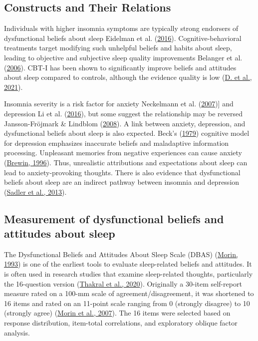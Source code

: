 \documentclass[
  ,doc,11pt, twoside,floatsintext]{apa6}
\begin{document}
\hypertarget{constructs-and-their-relations}{%
\subsection{Constructs and Their Relations}\label{constructs-and-their-relations}}

Individuals with higher insomnia symptoms are typically strong endorsers of dysfunctional beliefs about sleep Eidelman et al. (\protect\hyperlink{ref-eidelman2016}{2016}). Cognitive-behavioral treatments target modifying such unhelpful beliefs and habits about sleep, leading to objective and subjective sleep quality improvements Belanger et al. (\protect\hyperlink{ref-belanger2006}{2006}). CBT-I has been shown to significantly improve beliefs and attitudes about sleep compared to controls, although the evidence quality is low (\protect\hyperlink{ref-edingerjackd.2021}{D. et al., 2021}).

Insomnia severity is a risk factor for anxiety Neckelmann et al. (\protect\hyperlink{ref-neckelmann2007}{2007}){]} and depression Li et al. (\protect\hyperlink{ref-li2016}{2016}), but some suggest the relationship may be reversed Jansson-Fröjmark \& Lindblom (\protect\hyperlink{ref-jansson-frojmark2008b}{2008}). A link between anxiety, depression, and dysfunctional beliefs about sleep is also expected. Beck's (\protect\hyperlink{ref-beck1979cognitive}{1979}) cognitive model for depression emphasizes inaccurate beliefs and maladaptive information processing. Unpleasant memories from negative experiences can cause anxiety (\protect\hyperlink{ref-brewin1996theoretical}{Brewin, 1996}). Thus, unrealistic attributions and expectations about sleep can lead to anxiety-provoking thoughts. There is also evidence that dysfunctional beliefs about sleep are an indirect pathway between insomnia and depression (\protect\hyperlink{ref-sadler2013}{Sadler et al., 2013}).

\hypertarget{measurement-of-dysfunctional-beliefs-and-attitudes-about-sleep}{%
\subsection{Measurement of dysfunctional beliefs and attitudes about sleep}\label{measurement-of-dysfunctional-beliefs-and-attitudes-about-sleep}}

The Dysfunctional Beliefs and Attitudes About Sleep Scale (DBAS) (\protect\hyperlink{ref-morin1993insomnia}{Morin, 1993}) is one of the earliest tools to evaluate sleep-related beliefs and attitudes. It is often used in research studies that examine sleep-related thoughts, particularly the 16-question version (\protect\hyperlink{ref-thakral2020}{Thakral et al., 2020}). Originally a 30-item self-report measure rated on a 100-mm scale of agreement/disagreement, it was shortened to 16 items and rated on an 11-point scale ranging from 0 (strongly disagree) to 10 (strongly agree) (\protect\hyperlink{ref-morin2007a}{Morin et al., 2007}). The 16 items were selected based on response distribution, item-total correlations, and exploratory oblique factor analysis.
\end{document}
